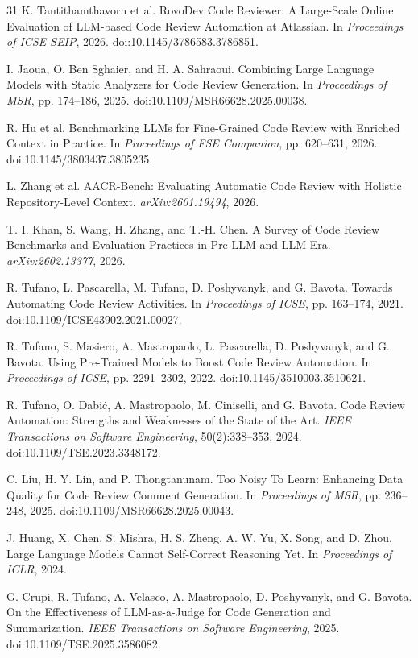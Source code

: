 \documentclass[acmsmall,screen,review,anonymous]{acmart}
\begin{document}
\begin{thebibliography}{31}
K. Tantithamthavorn et al. RovoDev Code Reviewer: A Large-Scale Online Evaluation of LLM-based Code Review Automation at Atlassian. In \emph{Proceedings of ICSE-SEIP}, 2026. doi:10.1145/3786583.3786851.

I. Jaoua, O. Ben Sghaier, and H. A. Sahraoui. Combining Large Language Models with Static Analyzers for Code Review Generation. In \emph{Proceedings of MSR}, pp. 174--186, 2025. doi:10.1109/MSR66628.2025.00038.

R. Hu et al. Benchmarking LLMs for Fine-Grained Code Review with Enriched Context in Practice. In \emph{Proceedings of FSE Companion}, pp. 620--631, 2026. doi:10.1145/3803437.3805235.

L. Zhang et al. AACR-Bench: Evaluating Automatic Code Review with Holistic Repository-Level Context. \emph{arXiv:2601.19494}, 2026.

T. I. Khan, S. Wang, H. Zhang, and T.-H. Chen. A Survey of Code Review Benchmarks and Evaluation Practices in Pre-LLM and LLM Era. \emph{arXiv:2602.13377}, 2026.

R. Tufano, L. Pascarella, M. Tufano, D. Poshyvanyk, and G. Bavota. Towards Automating Code Review Activities. In \emph{Proceedings of ICSE}, pp. 163--174, 2021. doi:10.1109/ICSE43902.2021.00027.

R. Tufano, S. Masiero, A. Mastropaolo, L. Pascarella, D. Poshyvanyk, and G. Bavota. Using Pre-Trained Models to Boost Code Review Automation. In \emph{Proceedings of ICSE}, pp. 2291--2302, 2022. doi:10.1145/3510003.3510621.

R. Tufano, O. Dabi\'c, A. Mastropaolo, M. Ciniselli, and G. Bavota. Code Review Automation: Strengths and Weaknesses of the State of the Art. \emph{IEEE Transactions on Software Engineering}, 50(2):338--353, 2024. doi:10.1109/TSE.2023.3348172.

C. Liu, H. Y. Lin, and P. Thongtanunam. Too Noisy To Learn: Enhancing Data Quality for Code Review Comment Generation. In \emph{Proceedings of MSR}, pp. 236--248, 2025. doi:10.1109/MSR66628.2025.00043.

J. Huang, X. Chen, S. Mishra, H. S. Zheng, A. W. Yu, X. Song, and D. Zhou. Large Language Models Cannot Self-Correct Reasoning Yet. In \emph{Proceedings of ICLR}, 2024.

G. Crupi, R. Tufano, A. Velasco, A. Mastropaolo, D. Poshyvanyk, and G. Bavota. On the Effectiveness of LLM-as-a-Judge for Code Generation and Summarization. \emph{IEEE Transactions on Software Engineering}, 2025. doi:10.1109/TSE.2025.3586082.


\end{thebibliography}
\end{document}
